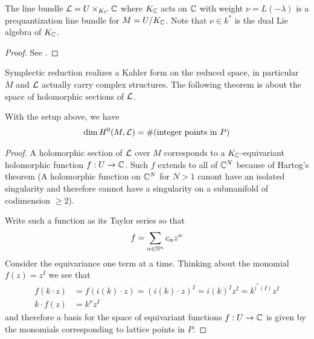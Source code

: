 \begin{remark}
\end{remark}

\begin{proposition}
    The line bundle ${\mathcal{L}} = U \times_{K_C} \mathbb{C}$ where $K_{\mathbb{C}}$ acts on $\mathbb{C}$ with 
    weight $\nu = L(-\lambda)$ is a prequantization line bundle for $M = U/K_{\mathbb{C}}$. Note that $\nu \in k^*$ is the 
    dual Lie algebra of $K_{\mathbb{C}}$.
\end{proposition}
\begin{proof}
    See \cite{hamilton}.
\end{proof}
Symplectic reduction realizes a Kahler form on the reduced space, in particular
$M$ and ${\mathcal{L}}$ actually carry complex structures. The following theorem is about the space of
holomorphic sections of ${\mathcal{L}}$.
\begin{theorem}
    With the setup above, we have \begin{align*}
        \dim H^0(M,{\mathcal{L}}) = \#(\text{integer points in } P)
    \end{align*}
\end{theorem}

\begin{proof}
    A holomorphic section of ${\mathcal{L}}$ over $M$ corresponds to a $K_{\mathbb{C}}$-equivariant holomorphic function $f:U\to \mathbb{C}$. 
    Such $f$ extends to all of $\mathbb{C}^N$ because of Hartog's theorem (A holomorphic function on $\mathbb{C}^N$ for $N>1$ canont have 
    an isolated singularity and therefore cannot have a singularity on a submanifold of codimension $\geq 2$).

    Write such a function as its Taylor series so that \begin{align*}
        f = \sum_{\alpha\in\mathbb{N}^n} c_\alpha z^\alpha
    \end{align*} Consider the equivariance one term at a time. 
    Thinking about the monomial $f(z) = z^I$ we 
    see that \begin{align*}
        f(k\cdot z) &= f(i(k)\cdot z) = (i(k)\cdot z)^I = i(k)^Iz^I = k^{i^*(I)}z^I \\
        k\cdot f(z) &= k^{\nu}z^I
    \end{align*} and therefore a basis for the space of equivariant functions $f:U\to \mathbb{C}$ 
    is given by the monomials corresponding to lattice points in $P$.
\end{proof}


